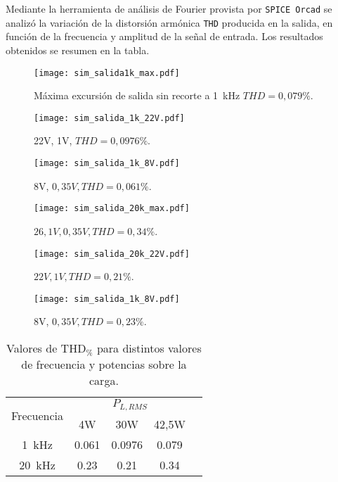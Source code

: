	Mediante la herramienta de análisis de Fourier provista por \texttt{SPICE Orcad} se analizó la variación de la distorsión armónica \texttt{THD} producida en la salida, en función de la frecuencia y amplitud de la señal de entrada. Los resultados obtenidos se resumen en la tabla.


\begin{figure}[H]
	\centering
	\texttt{[image: sim\_salida1k\_max.pdf]}
	\caption{Máxima excursión de salida sin recorte a \SI{1}{\kilo\hertz} $THD = 0,079\%$.}
	\label{fig:sim_salida_1k_max}
	\end{figure}

\begin{figure}[H]
	\centering
	\texttt{[image: sim\_salida\_1k\_22V.pdf]}
	\caption{22V, 1V, $THD=0,0976\%$.}
	\end{figure}

\begin{figure}[H]
	\centering
	\texttt{[image: sim\_salida\_1k\_8V.pdf]}
	\caption{8V, $0,35V, THD=0,061\%$.}
\end{figure}

\begin{figure}[H]
	\centering
	\texttt{[image: sim\_salida\_20k\_max.pdf]}
	\caption{$26,1V, 0,35V, THD=0,34\%$.}
\end{figure}

\begin{figure}[H]
	\centering
	\texttt{[image: sim\_salida\_20k\_22V.pdf]}
	\caption{$22V, 1V, THD=0,21\%$.}
\end{figure}

\begin{figure}[H]
	\centering
	\texttt{[image: sim\_salida\_1k\_8V.pdf]}
	\caption{8V, $0,35V, THD=0,23\%$.}
\end{figure}

\begin{table}[H]
	\centering
	\begin{tabular}{ccccc}
		\toprule
\multirow{2}{*}{Frecuencia} & \multicolumn{3}{c}{$P_{L,RMS}$} \\ 
		\cmidrule{2-4}
			& 4W & 30W & 42,5W \\
		\midrule
		\SI{1}{\kHz} & \num{0,061} & \num{0,0976} & \num{0,079} \\
		\SI{20}{\kHz} & \num{0.23} & \num{0,21} & \num{0,34} \\
		\bottomrule
	\end{tabular}
	\caption{Valores de $\mathrm{THD}_{\%}$ para distintos valores de frecuencia y potencias sobre la carga.}
\end{table}




